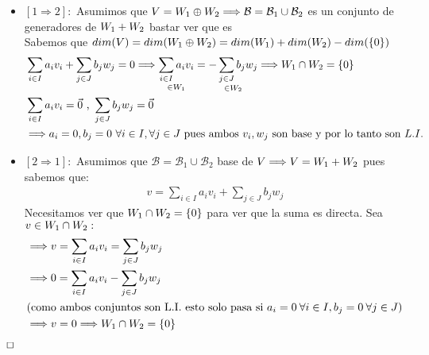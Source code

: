 \documentclass[]{article}
\newenvironment{proof}{\noindent{\bf Prueba:}}{$\hfill \Box$ \vspace{10pt}}
\newcommand{\ida}{\Longrightarrow}
\newcommand{\base}{\mathcal{B}}
\begin{document}
\begin{proof}
    \begin{itemize}
        \item $[1 \ida 2]:$ Asumimos que $V=\W{1}\oplus\W{2} \ida \base = \base_1 \cup \base_2$ es un conjunto de generadores de
        $\text{$W_{1}$}+\text{$W_{2}$}$ bastar ver que es \li\\
        Sabemos que $dim(V)=dim(\text{$W_{1}$}\oplus\text{$W_{2}$})=dim(\text{$W_{1}$})+dim(\text{$W_{2}$})-dim(\text{$\{ {0} \}$})$
        \begin{align*}
            &\sum_{i \in I} a_i v_i + \sum_{j \in J} b_j w_j = 0 \ida
            \underset{\in \W{1}}{\sum_{i \in I} a_i v_i} = \underset{\in \W{2}}{-\sum_{j \in J} b_j w_j} \ida \W{1}\cap\W{2}=\conjunto{0}\\
            &\sum_{i \in I} a_i v_i =  \vec{0} \text{ , } \sum_{j \in J} b_j w_j = \vec{0}\\
            &\ida a_i=0,b_j=0 \text{ $\forall i \in I, \forall j \in J$ pues ambos $v_i,w_j$ son base y por lo tanto son } \li
        \end{align*}
        \item $[2 \ida 1]:$ Asumimos que $\base=\base_1 \cup \base_2$  base de $V \ida V=\W{1}+\W{2}$ pues sabemos que:
        \begin{align*}
            v=\sum_{i \in I}a_i v_i + \sum_{j \in J}b_j w_j
        \end{align*}
        Necesitamos ver que $\text{$W_{1}$}\cap\text{$W_{2}$}=\text{$\{ {0} \}$}$ para ver que la suma es directa. Sea $v\in\text{$W_{1}$}\cap\text{$W_{2}$}:$
        \begin{align*}
            &\ida v=\sum_{i \in I}a_i v_i = \sum_{j \in J}b_j w_j\\
            &\ida 0=\sum_{i \in I}a_i v_i - \sum_{j \in J}b_j w_j\\
            &(\text{como ambos conjuntos son L.I. esto solo pasa si } a_i=0 \:\forall i \in I,b_j=0 \:\forall j \in J)\\
            &\ida v=0\ida \W{1}\cap\W{2}=\conjunto{0}
        \end{align*}
    \end{itemize}
\end{proof}
\end{document}
